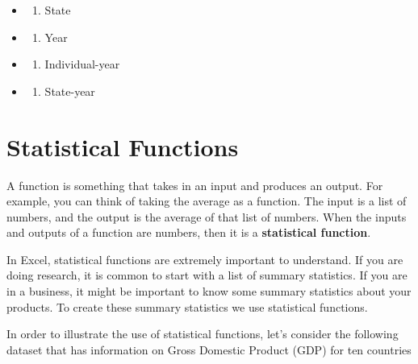 \documentclass[
]{book}
\providecommand{\tightlist}{%
  \setlength{\itemsep}{0pt}\setlength{\parskip}{0pt}}
\begin{document}
\begin{itemize}
\tightlist
\item
  \begin{enumerate}
  \def\labelenumi{(\Alph{enumi})}
  \tightlist
  \item
    State\\
  \end{enumerate}
\item
  \begin{enumerate}
  \def\labelenumi{(\Alph{enumi})}
  \setcounter{enumi}{1}
  \tightlist
  \item
    Year\\
  \end{enumerate}
\item
  \begin{enumerate}
  \def\labelenumi{(\Alph{enumi})}
  \setcounter{enumi}{2}
  \tightlist
  \item
    Individual-year\\
  \end{enumerate}
\item
  \begin{enumerate}
  \def\labelenumi{(\Alph{enumi})}
  \setcounter{enumi}{3}
  \tightlist
  \item
    State-year
  \end{enumerate}
\end{itemize}

\section{Statistical Functions}\label{statistical-functions}

A function is something that takes in an input and produces an output. For example, you can think of taking the average as a function. The input is a list of numbers, and the output is the average of that list of numbers. When the inputs and outputs of a function are numbers, then it is a \textbf{statistical function}.

In Excel, statistical functions are extremely important to understand. If you are doing research, it is common to start with a list of summary statistics. If you are in a business, it might be important to know some summary statistics about your products. To create these summary statistics we use statistical functions.

In order to illustrate the use of statistical functions, let's consider the following dataset that has information on Gross Domestic Product (GDP) for ten countries
\end{document}
